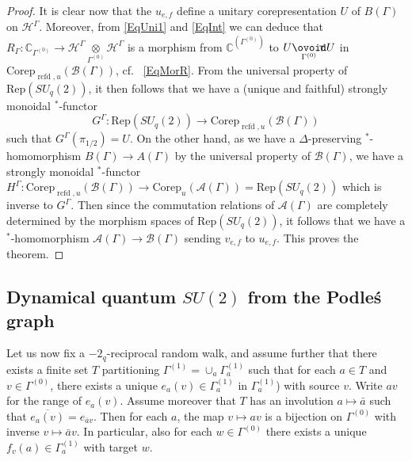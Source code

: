 \documentclass[11pt]{article}
\DeclareMathOperator{\rcf}{\mathrm{rcfd}}
\newcommand{\Corep}{\mathrm{Corep}}
\newcommand{\Circtv}[1]{\underset{#1}{\mathop{\ooalign{$\ovoid$\cr\hidewidth\raise-.05ex\hbox{$\scriptstyle\mathsf T\mkern3.5mu$}\cr}}}} %
\newcommand{\C}{\mathbb{C}}
\newcommand{\Hsp}{\mathcal{H}}
\newcommand{\Rep}{\mathrm{Rep}}
\theoremstyle{definition}
\numberwithin{equation}{section}
\begin{document}
\begin{proof}
It is clear now that the $u_{e,f}$ define a unitary corepresentation $U$ of $B(\Gamma)$ on $\Hsp^{\Gamma}$. Moreover, from \eqref{EqUni1} and \eqref{EqInt} we can deduce that $R_{\Gamma}: \C_{\Gamma^{(0)}}\rightarrow \Hsp^{\Gamma}\underset{\Gamma^{(0)}}{\otimes}\Hsp^{\Gamma}$ is a morphism from $\C^{(\Gamma^{(0)})}$ to $U\Circtv{\Gamma^{(0)}} U$ in $\Corep_{\rcf,u}(\mathscr{B}(\Gamma))$, cf.~ \eqref{EqMorR}. From the universal property of $\Rep(SU_q(2))$, it then follows that we have a (unique and faithful) strongly monoidal $^*$-functor \[G^{\Gamma}: \Rep(SU_q(2)) \rightarrow \Corep_{\rcf,u}(\mathscr{B}(\Gamma))\] such that $G^{\Gamma}(\pi_{1/2}) = U$. On the other hand, as we have a $\Delta$-preserving $^*$-homomorphism $B(\Gamma)\rightarrow A(\Gamma)$ by the universal property of $\mathscr{B}(\Gamma)$, we have a strongly monoidal $^*$-functor $H^{\Gamma}:  \Corep_{\rcf,u}(\mathscr{B}(\Gamma))\rightarrow \Corep_u(\mathscr{A}(\Gamma)) = \Rep(SU_q(2))$ which is inverse to $G^{\Gamma}$. Then since the commutation relations of $\mathscr{A}(\Gamma)$ are completely determined by the morphism spaces of $\Rep(SU_q(2))$, it follows that we have a $^*$-homomorphism $\mathscr{A}(\Gamma)\rightarrow \mathscr{B}(\Gamma)$ sending $v_{e,f}$ to $u_{e,f}$. This proves the theorem. 
\end{proof}

\subsection{Dynamical quantum $SU(2)$ from the Podle\'{s} graph}


Let us now fix a $-2_q$-reciprocal random walk, and assume further that there exists a finite set $T$ partitioning $\Gamma^{(1)} = \cup_a \Gamma^{(1)}_a$ such that for each $a\in T$ and $v\in \Gamma^{(0)}$, there exists a unique $e_a(v)\in \Gamma^{(1)}_a$ in $\Gamma^{(1)}_a$) with source $v$. Write $av$ for the range of $e_a(v)$. Assume moreover that $T$ has an involution $a\mapsto \bar{a}$ such that $\overline{e_a(v)} = e_{\bar{a}v}$. Then for each $a$, the map $v\mapsto av$ is a bijection on $\Gamma^{(0)}$ with inverse $v\mapsto \bar{a}v$. In particular, also for each $w\in \Gamma^{(0)}$ there exists a unique $f_v(a) \in \Gamma^{(1)}_a$ with target $w$.
\end{document}
